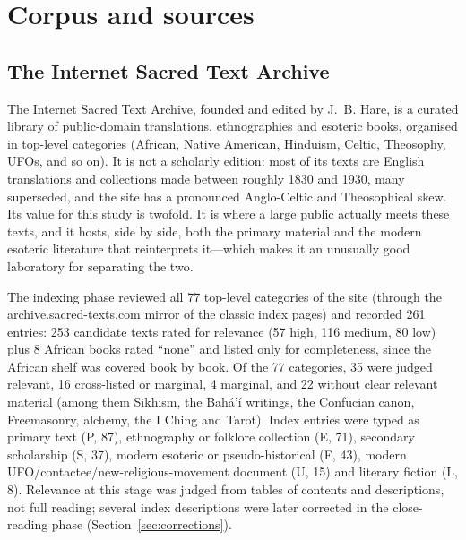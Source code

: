 \documentclass[11pt,a4paper]{article}
\begin{document}
\section{Corpus and sources}\label{sec:corpus}

\subsection{The Internet Sacred Text Archive}

The Internet Sacred Text Archive, founded and edited by J.~B. Hare, is a curated library of public-domain translations, ethnographies and esoteric books, organised in top-level categories (African, Native American, Hinduism, Celtic, Theosophy, UFOs, and so on). It is not a scholarly edition: most of its texts are English translations and collections made between roughly 1830 and 1930, many superseded, and the site has a pronounced Anglo-Celtic and Theosophical skew. Its value for this study is twofold. It is where a large public actually meets these texts, and it hosts, side by side, both the primary material and the modern esoteric literature that reinterprets it---which makes it an unusually good laboratory for separating the two.

The indexing phase reviewed all 77 top-level categories of the site (through the archive.sacred-texts.com mirror of the classic index pages) and recorded 261 entries: 253 candidate texts rated for relevance (57 high, 116 medium, 80 low) plus 8 African books rated ``none'' and listed only for completeness, since the African shelf was covered book by book. Of the 77 categories, 35 were judged relevant, 16 cross-listed or marginal, 4 marginal, and 22 without clear relevant material (among them Sikhism, the Bahá'í writings, the Confucian canon, Freemasonry, alchemy, the I Ching and Tarot). Index entries were typed as primary text (P, 87), ethnography or folklore collection (E, 71), secondary scholarship (S, 37), modern esoteric or pseudo-historical (F, 43), modern UFO/contactee/new-religious-movement document (U, 15) and literary fiction (L, 8). Relevance at this stage was judged from tables of contents and descriptions, not full reading; several index descriptions were later corrected in the close-reading phase (Section~\ref{sec:corrections}).
\end{document}
